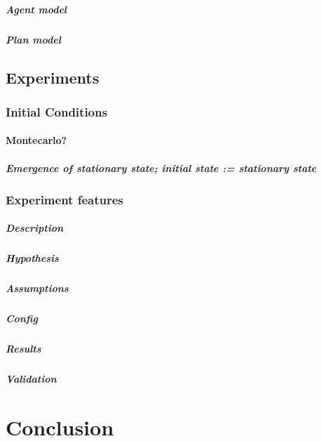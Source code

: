 \documentclass{report}
\begin{document}
				\paragraph{Agent model}
				\paragraph{Plan model}	
	\section{Experiments}	
		\subsection{Initial Conditions}
			\subsubsection{Montecarlo?} 
			\paragraph{Emergence of stationary state; initial state := stationary state}
		\subsection{Experiment features}
			\paragraph{Description}
			\paragraph{Hypothesis}
			\paragraph{Assumptions}
			\paragraph{Config}
			\paragraph{Results}
			\paragraph{Validation}
	

\newpage 
\chapter{Conclusion}
\end{document}
